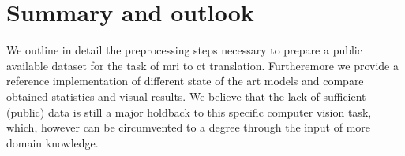 \section{Summary and outlook}

We outline in detail the preprocessing steps necessary to prepare a public
available dataset for the task of \gls{mri} to \gls{ct} translation.
Furtheremore we provide a reference implementation of different state of the
art models and compare obtained statistics and visual results. We believe
that the lack of sufficient (public) data is still a major holdback to this
specific computer vision task, which, however can be circumvented to a degree
through the input of more domain knowledge.
